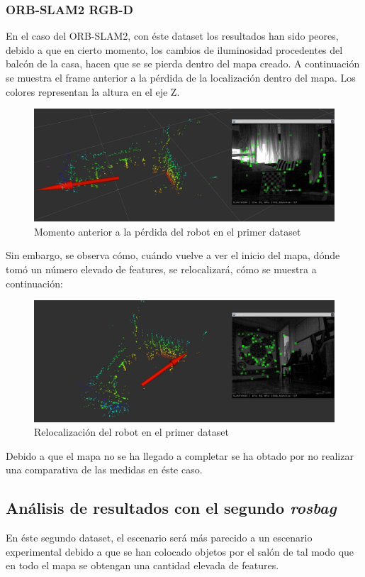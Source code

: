 \subsubsection{ORB-SLAM2 RGB-D}
En el caso del ORB-SLAM2, con éste dataset los resultados han sido peores, debido a que en cierto momento, los cambios de iluminosidad procedentes del balcón de la casa, hacen que se
se pierda dentro del mapa creado. A continuación se muestra el frame anterior a la pérdida de la localización dentro del mapa. Los colores representan la altura en el eje Z.
\begin{figure}[h!]
    \centering
    \includegraphics[width=.9\textwidth]{images/slam/bag1_orb_beforeLOSE}
    \caption{Momento anterior a la pérdida del robot en el primer dataset}
\end{figure}

Sin embargo, se observa cómo, cuándo vuelve a ver el inicio del mapa, dónde tomó un número elevado de features, se relocalizará, cómo se muestra a continuación:
\begin{figure}[h!]
    \centering
    \includegraphics[width=.9\textwidth]{images/slam/bag1_orb_relocal}
    \caption{Relocalización del robot en el primer dataset}
\end{figure}

Debido a que el mapa no se ha llegado a completar se ha obtado por no realizar una comparativa de las medidas en éste caso.

\newpage

\subsection{Análisis de resultados con el segundo \textit{rosbag}}
En éste segundo dataset, el escenario será más parecido a un escenario experimental debido a que se han colocado objetos por el salón de tal modo que en todo el mapa se
obtengan una cantidad elevada de features.

